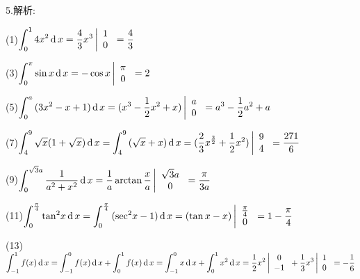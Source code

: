 5.解析:

(1)$\displaystyle\int_0^1 {4{x^2}} \rd x = \frac{4}{3}{x^3}\left| {\begin{array}{*{20}{c}}
  1 \\
  0
\end{array}} \right. = \dfrac{4}{3}$

(3)$\displaystyle\int_0^\pi  {\sin x\rd x}  =  - \cos x\left| {\begin{array}{*{20}{c}}
  \pi  \\
  0
\end{array}} \right. = 2$

(5)$\displaystyle\int_0^a {(3{x^2}}  - x + 1)\rd x = ({x^3} - \dfrac{1}{2}{x^2} + x)\left| {\begin{array}{*{20}{c}}
  a \\
  0
\end{array}} \right. = {a^3} - \dfrac{1}{2}{a^2} + a$

(7)$\displaystyle\int_4^9 {\sqrt x } (1 + \sqrt x )\rd x = \displaystyle\int_4^9 {(\sqrt x  + x} )\rd x = (\dfrac{2}{3}{x^{\frac{3}{2}}} + \dfrac{1}{2}{x^2})\left| {\begin{array}{*{20}{c}}
  9 \\
  4
\end{array}} \right. = \dfrac{{271}}{6}$

(9)$\displaystyle\int_0^{\sqrt 3 a} {\dfrac{1}{{{a^2} + {x^2}}}} \rd x = \dfrac{1}{a}\arctan \dfrac{x}{a}\left| {\begin{array}{*{20}{c}}
  {\sqrt 3 a} \\
  0
\end{array}} \right. = \dfrac{\pi }{{3a}}$

(11)$\displaystyle\int_0^{\frac{\pi }{4}} {{{\tan }^2}} x\rd x = \displaystyle\int_0^{\frac{\pi }{4}} {({{\sec }^2}x - 1} )\rd x = (\tan x - x)\left| {\begin{array}{*{20}{c}}
  {\frac{\pi }{4}} \\
  0
\end{array}} \right. = 1 - \dfrac{\pi }{4}$

(13)$\displaystyle\int_{ - 1}^1 {f(x)\rd x}  = \displaystyle\int_{ - 1}^0 {f(x)\rd x + \displaystyle\int_0^1 {f(x)\rd x} }  = \displaystyle\int_{ - 1}^0 {x\rd x + \displaystyle\int_0^1 {{x^2}\rd x} }  = \dfrac{1}{2}{x^2}\left| {\begin{array}{*{20}{c}}
  0 \\
  { - 1}
\end{array}} \right. + \dfrac{1}{3}{x^3}\left| {\begin{array}{*{20}{c}}
  1 \\
  0
\end{array}} \right. =  - \dfrac{1}{6}$

